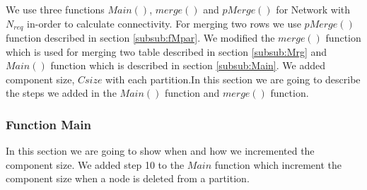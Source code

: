 \documentclass[12pt]{article}
\begin{document}
We use three functions $Main()$, $merge()$ and $pMerge()$  for Network with $N_{req}$ in-order to calculate connectivity. For merging two rows we use $pMerge()$ function described in section \ref{subsub:fMpar}. We modified the $merge()$ function which is used for merging two table described in section \ref{subsub:Mrg} and $Main()$ function which is described in section \ref{subsub:Main}. We added component size, $Csize$ with each partition.In this section we are going to describe the steps we added in the $Main()$ function and $merge()$ function.
\subsubsection{Function Main}
In this section we are going to show when and how we incremented the component size. We added step 10 to the $Main$ function which increment the component size when a node is deleted from a partition.
\end{document}
